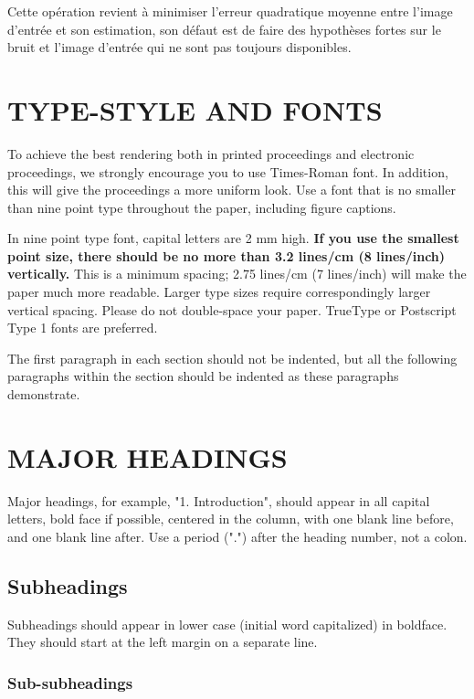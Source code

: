 \documentclass{article}
\begin{document}
	Cette opération revient à minimiser l'erreur quadratique moyenne entre l'image d'entrée et son estimation, son défaut est de faire des hypothèses fortes sur le bruit et l'image d'entrée qui ne sont pas toujours disponibles.
	
	
	
	
	
\section{TYPE-STYLE AND FONTS}
\label{sec:typestyle}

To achieve the best rendering both in printed proceedings and electronic proceedings, we
strongly encourage you to use Times-Roman font.  In addition, this will give
the proceedings a more uniform look.  Use a font that is no smaller than nine
point type throughout the paper, including figure captions.

In nine point type font, capital letters are 2 mm high.  {\bf If you use the
smallest point size, there should be no more than 3.2 lines/cm (8 lines/inch)
vertically.}  This is a minimum spacing; 2.75 lines/cm (7 lines/inch) will make
the paper much more readable.  Larger type sizes require correspondingly larger
vertical spacing.  Please do not double-space your paper.  TrueType or
Postscript Type 1 fonts are preferred.

The first paragraph in each section should not be indented, but all the
following paragraphs within the section should be indented as these paragraphs
demonstrate.

\section{MAJOR HEADINGS}
\label{sec:majhead}

Major headings, for example, "1. Introduction", should appear in all capital
letters, bold face if possible, centered in the column, with one blank line
before, and one blank line after. Use a period (".") after the heading number,
not a colon.

\subsection{Subheadings}
\label{ssec:subhead}

Subheadings should appear in lower case (initial word capitalized) in
boldface.  They should start at the left margin on a separate line.
 
\subsubsection{Sub-subheadings}
\label{sssec:subsubhead}
\end{document}
